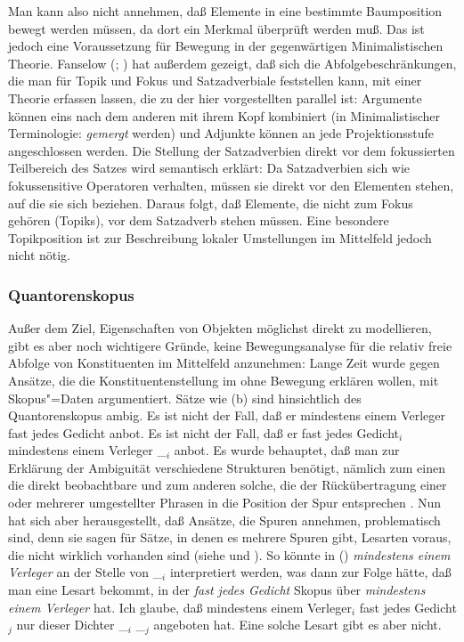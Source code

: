 Man kann also nicht annehmen, daß Elemente in eine bestimmte Baumposition bewegt werden müssen,
da dort ein Merkmal überprüft werden muß. Das ist jedoch eine Voraussetzung für Bewegung in
der gegenwärtigen Minimalistischen Theorie. Fanselow (\citeyear[Abschnitt~4]{Fanselow2003b}; \citeyear[]{Fanselow2006a}) 
hat außerdem gezeigt, daß sich die Abfolgebeschränkungen,
die man für Topik und Fokus und Satzadverbiale
feststellen kann, mit einer Theorie erfassen lassen,
die zu der hier vorgestellten parallel ist: Argumente können eins nach dem anderen mit ihrem Kopf
kombiniert (in Minimalistischer Terminologie: \emph{gemergt} werden) und Adjunkte können an jede
Projektionsstufe angeschlossen werden. Die Stellung der Satzadverbien direkt vor dem fokussierten
Teilbereich des Satzes wird semantisch erklärt: Da Satzadverbien sich wie fokussensitive Operatoren
verhalten, müssen sie direkt vor den Elementen stehen, auf die sie sich beziehen. Daraus folgt,
daß Elemente, die nicht zum Fokus gehören (Topiks), vor dem Satzadverb stehen müssen. Eine besondere
Topikposition ist zur Beschreibung lokaler Umstellungen im Mittelfeld jedoch nicht nötig.
%

\subsubsection{Quantorenskopus}
\label{sec-Scrambling-Skopus}

Außer
dem Ziel, Eigenschaften von Objekten möglichst direkt zu modellieren, gibt es aber noch wichtigere
Gründe, keine Bewegungsanalyse für die relativ freie Abfolge von Konstituenten im Mittelfeld anzunehmen:
Lange Zeit wurde gegen Ansätze, die die Konstituentenstellung im \mf ohne Bewegung erklären wollen,
mit Skopus"=Daten argumentiert. Sätze wie (b) sind hinsichtlich des Quantorenskopus ambig.
\eal
\ex Es ist nicht der Fall, daß er mindestens einem Verleger fast jedes Gedicht anbot.
\ex Es ist nicht der Fall, daß er fast jedes Gedicht$_i$ mindestens einem Verleger \_$_i$ anbot.
\zl
Es wurde behauptet, daß man zur Erklärung der Ambiguität verschiedene Strukturen benötigt, nämlich
zum einen die direkt beobachtbare und zum anderen solche, die der Rückübertragung einer oder
mehrerer umgestellter Phrasen in die Position der Spur entsprechen \citep{Frey93a}.
Nun hat sich aber herausgestellt, daß Ansätze, die Spuren annehmen,
problematisch sind, denn sie sagen für Sätze, in denen es mehrere Spuren gibt, 
Lesarten voraus, die nicht wirklich vorhanden sind (siehe  und ).
So könnte \zb in () \emph{mindestens einem Verleger} an der Stelle von \_$_i$ interpretiert werden,
was dann zur Folge hätte, daß man eine Lesart bekommt, in der
\emph{fast jedes Gedicht} Skopus über \emph{mindestens einem Verleger} hat.
\ea
Ich glaube, daß mindestens einem Verleger$_i$ fast jedes Gedicht$_j$ nur dieser Dichter \_$_i$ \_$_j$ angeboten hat.
\z
Eine solche Lesart gibt es aber nicht.%

